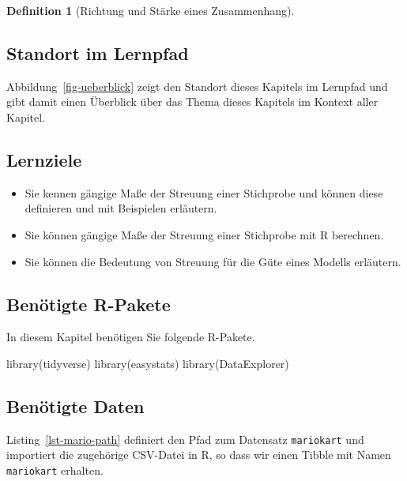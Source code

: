 \documentclass[
  a4paper,
  DIV=11]{scrreprt}
\newenvironment{Shaded}{\begin{snugshade}}{\end{snugshade}}
\newcommand{\FunctionTok}[1]{\textcolor[rgb]{0.28,0.35,0.67}{#1}}
\newcommand{\NormalTok}[1]{\textcolor[rgb]{0.00,0.23,0.31}{#1}}
\providecommand{\tightlist}{%
  \setlength{\itemsep}{0pt}\setlength{\parskip}{0pt}}\usepackage{longtable,booktabs,array}
\theoremstyle{definition}
\theoremstyle{definition}
\theoremstyle{definition}
\newtheorem{definition}{Definition}[chapter]
\theoremstyle{remark}
\begin{document}
\begin{definition}[Richtung und Stärke eines
Zusammenhang]
\subsection{Standort im Lernpfad}\label{standort-im-lernpfad-5}

Abbildung~\ref{fig-ueberblick} zeigt den Standort dieses Kapitels im
Lernpfad und gibt damit einen Überblick über das Thema dieses Kapitels
im Kontext aller Kapitel.

\subsection{Lernziele}\label{lernziele-6}

\begin{itemize}
\tightlist
\item
  Sie kennen gängige Maße der Streuung einer Stichprobe und können diese
  definieren und mit Beispielen erläutern.
\item
  Sie können gängige Maße der Streuung einer Stichprobe mit R berechnen.
\item
  Sie können die Bedeutung von Streuung für die Güte eines Modells
  erläutern.
\end{itemize}

\subsection{Benötigte R-Pakete}\label{benuxf6tigte-r-pakete-4}

In diesem Kapitel benötigen Sie folgende R-Pakete.

\begin{Shaded}
\begin{Highlighting}[]
\FunctionTok{library}\NormalTok{(tidyverse)}
\FunctionTok{library}\NormalTok{(easystats)}
\FunctionTok{library}\NormalTok{(DataExplorer)}
\end{Highlighting}
\end{Shaded}

\subsection{Benötigte Daten}\label{benuxf6tigte-daten-4}

Listing~\ref{lst-mario-path} definiert den Pfad zum Datensatz
\texttt{mariokart} und importiert die zugehörige CSV-Datei in R, so dass
wir einen Tibble mit Namen \texttt{mariokart} erhalten.

\begin{codelisting}


\end{codelisting}
\end{definition}
\end{document}
